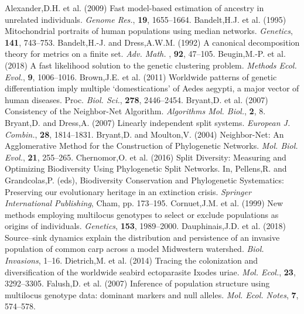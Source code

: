\documentclass[final]{bioinfo}
\begin{document}
%
%
%
%
%
%

%
\begin{thebibliography}{}

\bibitem[a ()]{}
\bibitem[a ()]{}Alexander,D.H. et al. (2009) Fast model-based estimation of ancestry in unrelated individuals. \textit{Genome Res.}, \textbf{19}, 1655–1664.
\bibitem[a ()]{}Bandelt,H.J. et al. (1995) Mitochondrial portraits of human populations using median networks. \textit{Genetics}, \textbf{141}, 743–753.
\bibitem[a ()]{}Bandelt,H.-J. and Dress,A.W.M. (1992) A canonical decomposition theory for metrics on a finite set. \textit{Adv. Math. }, \textbf{92}, 47–105.
\bibitem[a ()]{}Beugin,M.-P. et al. (2018) A fast likelihood solution to the genetic clustering problem. \textit{Methods Ecol. Evol.}, \textbf{9}, 1006–1016.
\bibitem[a ()]{}Brown,J.E. et al. (2011) Worldwide patterns of genetic differentiation imply multiple ‘domestications’ of Aedes aegypti, a major vector of human diseases. Proc. \textit{Biol. Sci.}, \textbf{278}, 2446–2454.
\bibitem[a ()]{}Bryant,D. et al. (2007) Consistency of the Neighbor-Net Algorithm. \textit{Algorithms Mol. Biol.}, \textbf{2}, 8.
\bibitem[a ()]{}Bryant,D. and Dress,A. (2007) Linearly independent split systems. \textit{European J. Combin.}, \textbf{28}, 1814–1831.
\bibitem[a ()]{}Bryant,D. and Moulton,V. (2004) Neighbor-Net: An Agglomerative Method for the Construction of Phylogenetic Networks. \textit{Mol. Biol. Evol.}, \textbf{21}, 255–265.
\bibitem[a ()]{}Chernomor,O. et al. (2016) Split Diversity: Measuring and Optimizing Biodiversity Using Phylogenetic Split Networks. In, Pellens,R. and Grandcolas,P. (eds), Biodiversity Conservation and Phylogenetic Systematics: Preserving our evolutionary heritage in an extinction crisis. \textit{Springer International Publishing}, Cham, pp. 173–195.
\bibitem[a ()]{}Cornuet,J.M. et al. (1999) New methods employing multilocus genotypes to select or exclude populations as origins of individuals. \textit{Genetics}, \textbf{153}, 1989–2000.
\bibitem[a ()]{}Dauphinais,J.D. et al. (2018) Source–sink dynamics explain the distribution and persistence of an invasive population of common carp across a model Midwestern watershed. \textit{Biol. Invasions}, 1–16.
\bibitem[a ()]{}Dietrich,M. et al. (2014) Tracing the colonization and diversification of the worldwide seabird ectoparasite Ixodes uriae. \textit{Mol. Ecol.}, \textbf{23}, 3292–3305.
\bibitem[a ()]{}Falush,D. et al. (2007) Inference of population structure using multilocus genotype data: dominant markers and null alleles. \textit{Mol. Ecol. Notes}, \textbf{7}, 574–578.

\end{thebibliography}
\end{document}
